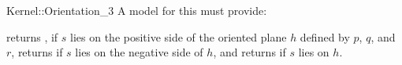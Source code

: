 \begin{ccRefFunctionObjectConcept}{Kernel::Orientation_3}
A model for this must provide:


{returns , if $s$ lies on the positive side of the oriented 
plane $h$ defined by $p$, $q$, and $r$, returns  if $s$ 
lies on the negative side of $h$, and returns  if $s$ lies
on $h$.}

\end{ccRefFunctionObjectConcept}
